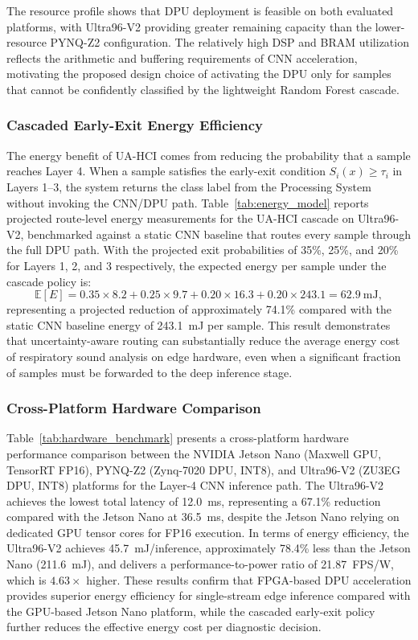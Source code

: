 

The resource profile shows that DPU deployment is feasible on both evaluated platforms, with Ultra96-V2 providing greater remaining capacity than the lower-resource PYNQ-Z2 configuration. The relatively high DSP and BRAM utilization reflects the arithmetic and buffering requirements of CNN acceleration, motivating the proposed design choice of activating the DPU only for samples that cannot be confidently classified by the lightweight Random Forest cascade.

\subsubsection{Cascaded Early-Exit Energy Efficiency}
The energy benefit of UA-HCI comes from reducing the probability that a sample reaches Layer 4. When a sample satisfies the early-exit condition $S_i(x)\ge\tau_i$ in Layers 1--3, the system returns the class label from the Processing System without invoking the CNN/DPU path. Table~\ref{tab:energy_model} reports projected route-level energy measurements for the UA-HCI cascade on Ultra96-V2, benchmarked against a static CNN baseline that routes every sample through the full DPU path. With the projected exit probabilities of 35\%, 25\%, and 20\% for Layers 1, 2, and 3 respectively, the expected energy per sample under the cascade policy is:
\begin{equation}
\mathbb{E}[E] = 0.35{\times}8.2 + 0.25{\times}9.7 + 0.20{\times}16.3 + 0.20{\times}243.1 = 62.9~\text{mJ},
\end{equation}
representing a projected reduction of approximately 74.1\% compared with the static CNN baseline energy of 243.1~mJ per sample. This result demonstrates that uncertainty-aware routing can substantially reduce the average energy cost of respiratory sound analysis on edge hardware, even when a significant fraction of samples must be forwarded to the deep inference stage.



\subsubsection{Cross-Platform Hardware Comparison}
Table~\ref{tab:hardware_benchmark} presents a cross-platform hardware performance comparison between the NVIDIA Jetson Nano (Maxwell GPU, TensorRT FP16), PYNQ-Z2 (Zynq-7020 DPU, INT8), and Ultra96-V2 (ZU3EG DPU, INT8) platforms for the Layer-4 CNN inference path. The Ultra96-V2 achieves the lowest total latency of 12.0~ms, representing a 67.1\% reduction compared with the Jetson Nano at 36.5~ms, despite the Jetson Nano relying on dedicated GPU tensor cores for FP16 execution. In terms of energy efficiency, the Ultra96-V2 achieves 45.7~mJ/inference, approximately 78.4\% less than the Jetson Nano (211.6~mJ), and delivers a performance-to-power ratio of 21.87~FPS/W, which is $4.63\times$ higher. These results confirm that FPGA-based DPU acceleration provides superior energy efficiency for single-stream edge inference compared with the GPU-based Jetson Nano platform, while the cascaded early-exit policy further reduces the effective energy cost per diagnostic decision.

